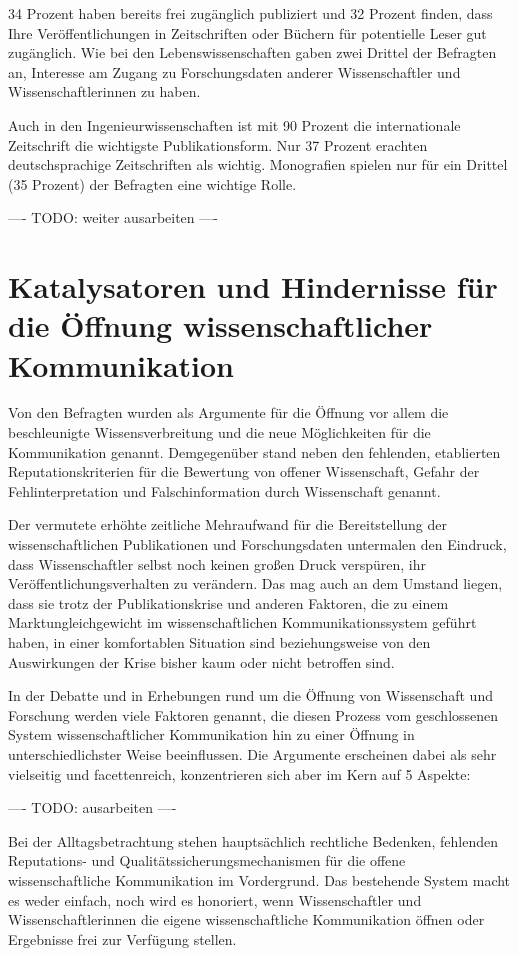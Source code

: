 34 Prozent haben bereits frei zugänglich publiziert und 32 Prozent finden, dass Ihre Veröffentlichungen in Zeitschriften oder Büchern für potentielle Leser gut zugänglich. Wie bei den Lebenswissenschaften gaben zwei Drittel der Befragten an, Interesse am Zugang zu Forschungsdaten anderer Wissenschaftler und Wissenschaftlerinnen zu haben.

Auch in den Ingenieurwissenschaften ist mit 90 Prozent die internationale Zeitschrift die wichtigste Publikationsform. Nur 37 Prozent erachten deutschsprachige Zeitschriften als wichtig. Monografien spielen nur für ein Drittel (35 Prozent) der Befragten eine wichtige Rolle.

---- TODO: weiter ausarbeiten ----

\section{Katalysatoren und Hindernisse für die Öffnung wissenschaftlicher Kommunikation}

Von den Befragten wurden als Argumente für die Öffnung vor allem die beschleunigte Wissensverbreitung und die neue Möglichkeiten für die Kommunikation genannt. Demgegenüber stand neben den fehlenden, etablierten Reputationskriterien für die Bewertung von offener Wissenschaft, Gefahr der Fehlinterpretation und Falschinformation durch Wissenschaft genannt.

Der vermutete erhöhte zeitliche Mehraufwand für die Bereitstellung der wissenschaftlichen Publikationen und Forschungsdaten untermalen den Eindruck, dass Wissenschaftler selbst noch keinen großen Druck verspüren, ihr Veröffentlichungsverhalten zu verändern. Das mag auch an dem Umstand liegen, dass sie trotz der Publikationskrise und anderen Faktoren, die zu einem Marktungleichgewicht im wissenschaftlichen Kommunikationssystem geführt haben, in einer komfortablen Situation sind beziehungsweise von den Auswirkungen der Krise bisher kaum oder nicht betroffen sind.

In der Debatte und in Erhebungen rund um die Öffnung von Wissenschaft und Forschung werden viele Faktoren genannt, die diesen Prozess vom geschlossenen System wissenschaftlicher Kommunikation hin zu einer Öffnung in unterschiedlichster Weise beeinflussen. Die Argumente erscheinen dabei als sehr vielseitig und facettenreich, konzentrieren sich aber im Kern auf 5 Aspekte:

---- TODO: ausarbeiten ----

Bei der Alltagsbetrachtung stehen hauptsächlich rechtliche Bedenken, fehlenden Reputations- und Qualitätssicherungsmechanismen für die offene wissenschaftliche Kommunikation im Vordergrund. Das bestehende System macht es weder einfach, noch wird es honoriert, wenn Wissenschaftler und Wissenschaftlerinnen die eigene wissenschaftliche Kommunikation öffnen oder Ergebnisse frei zur Verfügung stellen.

